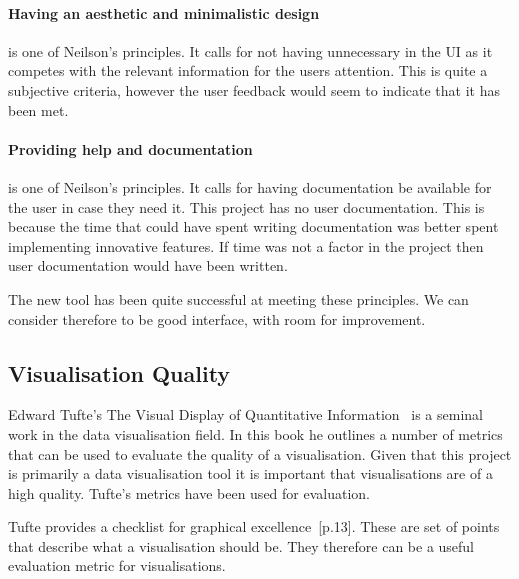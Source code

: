 \paragraph*{Having an aesthetic and minimalistic design} is one of Neilson's principles.  It calls for not having unnecessary in the \ac{UI} as it competes with the relevant information for the users attention.  This is quite a subjective criteria, however the user feedback would seem to indicate that it has been met.

\paragraph*{Providing help and documentation} is one of Neilson's principles.  It calls for having documentation be available for the user in case they need it.  This project has no user documentation.  This is because the time that could have spent writing documentation was better spent implementing innovative features.  If time was not a factor in the project then user documentation would have been written.

The new tool has been quite successful at meeting these principles.  We can consider therefore to be good interface, with room for improvement.

\subsection{Visualisation Quality}

Edward Tufte's The Visual Display of Quantitative Information~\cite{tufte} is a seminal work in the data visualisation field.  In this book he outlines a number of metrics that can be used to evaluate the quality of a visualisation.  Given that this project is primarily a data visualisation tool it is important that visualisations are of a high quality.  Tufte's metrics have been used for evaluation.

Tufte provides a checklist for graphical excellence~\cite{tufte}[p.13].  These are set of points that describe what a visualisation should be.  They therefore can be a useful evaluation metric for visualisations.

